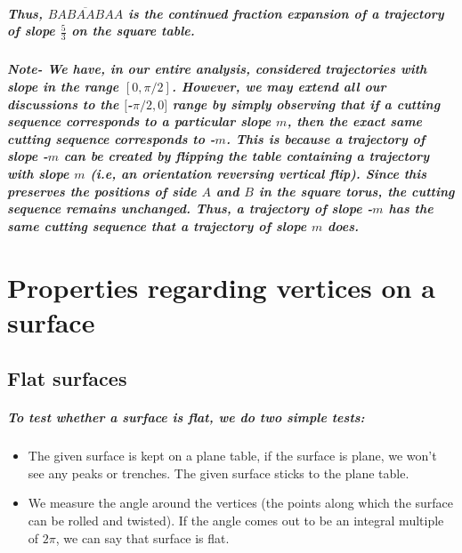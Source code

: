 \documentclass{report}
\begin{document}
\paragraph{Thus, $\overline{BABAABAA}$ is the continued fraction expansion of a trajectory of slope $\frac{5}{3}$ on the square table.}


\paragraph{Note- We have, in our entire analysis, considered trajectories with slope in the range $[0, \pi/2]$. However, we may extend all our discussions to the $[$-$\pi/2, 0]$ range by simply observing that if a cutting sequence corresponds to a particular slope $m$, then the exact same cutting sequence corresponds to -$m$. This is because a trajectory of slope -$m$ can be created by flipping the table containing a trajectory with slope $m$ (i.e, an orientation reversing vertical flip). Since this preserves the positions of side $A$ and $B$ in the square torus, the cutting sequence remains unchanged. Thus, a trajectory of slope -$m$ has the same cutting sequence that a trajectory of slope $m$ does.}



\appendix

\chapter{Properties regarding vertices on a surface}

\section{Flat surfaces}

\paragraph{To test whether a surface is flat, we do two simple tests:}

\begin{itemize}
\item  {The given surface is kept on a plane table, if the surface is plane, we won’t see any peaks or trenches. The given surface sticks to the plane table.}

\item  { We measure the angle around the vertices (the points along which the surface can be rolled and twisted). If the angle comes out to be an integral multiple of $2\pi$, we can say that surface is flat.}
\end{itemize}
\end{document}
